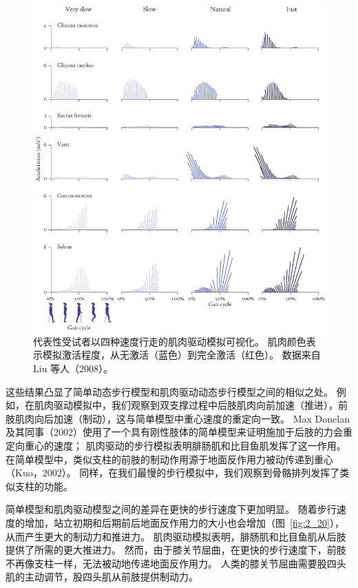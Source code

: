 \begin{figure}[!htb]
	\centering
	\includegraphics[width=1.0\linewidth]{chap11/11_11}
	\caption{代表性受试者以四种速度行走的肌肉驱动模拟可视化。
		肌肉颜色表示模拟激活程度，从无激活（蓝色）到完全激活（红色）。
		数据来自 Liu 等人（2008）。 \label{fig:11_11}}
\end{figure}

这些结果凸显了简单动态步行模型和肌肉驱动动态步行模型之间的相似之处。
例如，在肌肉驱动模拟中，我们观察到双支撑过程中后肢肌肉向前加速（推进），前肢肌肉向后加速（制动），这与简单模型中重心速度的重定向一致。
Max Donelan 及其同事（2002）使用了一个具有刚性肢体的简单模型来证明施加于后肢的力会重定向重心的速度；
肌肉驱动的步行模拟表明腓肠肌和比目鱼肌发挥了这一作用。
在简单模型中，类似支柱的前肢的制动作用源于地面反作用力被动传递到重心（Kuo，2002）。
同样，在我们最慢的步行模拟中，我们观察到骨骼排列发挥了类似支柱的功能。


简单模型和肌肉驱动模型之间的差异在更快的步行速度下更加明显。
随着步行速度的增加，站立初期和后期前后地面反作用力的大小也会增加（图~\ref{fig:2_20}），从而产生更大的制动力和推进力。
肌肉驱动模拟表明，腓肠肌和比目鱼肌从后肢提供了所需的更大推进力。
然而，由于膝关节屈曲，在更快的步行速度下，前肢不再像支柱一样，无法被动地传递地面反作用力。
人类的膝关节屈曲需要股四头肌的主动调节，股四头肌从前肢提供制动力。


